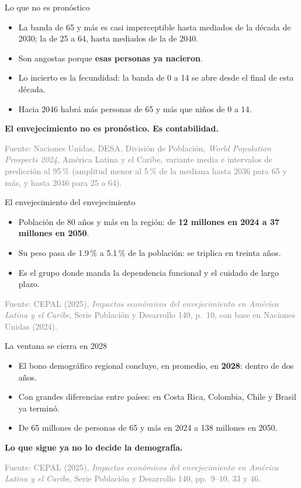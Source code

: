 \documentclass[aspectratio=169,11pt]{beamer}
\newcommand{\clave}[1]{\textcolor{acento}{\textbf{#1}}}
\newcommand{\destacar}[1]{\vspace{0.6em}\begin{center}\textbf{#1}\end{center}}
\newcommand{\pie}[1]{\vfill{\scriptsize\textcolor{gray}{#1}}}
\begin{document}
\begin{frame}{Lo que no es pronóstico}
  \begin{itemize}
    \item La banda de 65 y más es casi imperceptible hasta mediados de la década de 2030; la de 25 a 64, hasta mediados de la de 2040.
    \item Son angostas porque \clave{esas personas ya nacieron}.
    \item Lo incierto es la fecundidad: la banda de 0 a 14 se abre desde el final de esta década.
    \item Hacia 2046 habrá más personas de 65 y más que niños de 0 a 14.
  \end{itemize}
  \destacar{El envejecimiento no es pronóstico. Es contabilidad.}
  \pie{Fuente: Naciones Unidas, DESA, División de Población, \emph{World Population Prospects 2024}, América Latina y el Caribe, variante media e intervalos de predicción al 95\,\% (amplitud menor al 5\,\% de la mediana hasta 2036 para 65 y más, y hasta 2046 para 25 a 64).}
\end{frame}

\begin{frame}{El envejecimiento del envejecimiento}
  \begin{itemize}
    \item Población de 80 años y más en la región: de \clave{12 millones en 2024 a 37 millones en 2050}.
    \item Su peso pasa de 1.9\,\% a 5.1\,\% de la población: se triplica en treinta años.
    \item Es el grupo donde manda la dependencia funcional y el cuidado de largo plazo.
  \end{itemize}
  \pie{Fuente: CEPAL (2025), \emph{Impactos económicos del envejecimiento en América Latina y el Caribe}, Serie Población y Desarrollo 140, p.~10, con base en Naciones Unidas (2024).}
\end{frame}

\begin{frame}{La ventana se cierra en 2028}
  \begin{itemize}
    \item El bono demográfico regional concluye, en promedio, en \clave{2028}: dentro de dos años.
    \item Con grandes diferencias entre países: en Costa Rica, Colombia, Chile y Brasil ya terminó.
    \item De 65 millones de personas de 65 y más en 2024 a 138 millones en 2050.
  \end{itemize}
  \destacar{Lo que sigue ya no lo decide la demografía.}
  \pie{Fuente: CEPAL (2025), \emph{Impactos económicos del envejecimiento en América Latina y el Caribe}, Serie Población y Desarrollo 140, pp.~9--10, 33 y 46.}
\end{frame}
\end{document}
